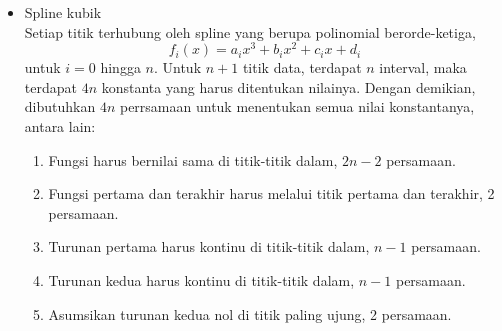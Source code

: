 \documentclass{article}
\begin{document}
\begin{enumerate}
\begin{itemize}
        \item Spline kubik \\
        Setiap titik terhubung oleh spline yang berupa polinomial berorde-ketiga,
        \begin{equation*}
            f_i(x) = a_ix^3 + b_ix^2 + c_ix + d_i
        \end{equation*}
        untuk $i = 0$ hingga $n$. Untuk $n+1$ titik data, terdapat $n$ interval, maka terdapat $4n$ konstanta yang harus ditentukan nilainya.
        Dengan demikian, dibutuhkan $4n$ perrsamaan untuk menentukan semua nilai konstantanya, antara lain:
        \begin{enumerate}
            \item Fungsi harus bernilai sama di titik-titik dalam, $2n - 2$ persamaan.
            \item Fungsi pertama dan terakhir harus melalui titik pertama dan terakhir, 2 persamaan.
            \item Turunan pertama harus kontinu di titik-titik dalam, $n - 1$ persamaan.
            \item Turunan kedua harus kontinu di titik-titik dalam, $n - 1$ persamaan.
            \item Asumsikan turunan kedua nol di titik paling ujung, 2 persamaan. 
        \end{enumerate}

    \end{itemize}

\end{enumerate}
\end{document}
